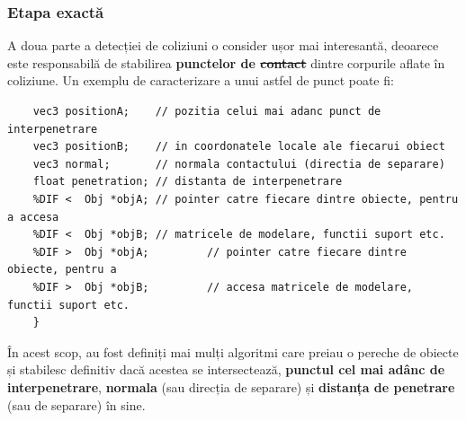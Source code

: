 \documentclass[12pt,a4paper]{report}
\providecommand{\DIFaddtex}[1]{{\protect\color{blue}\uwave{#1}}} %
\providecommand{\DIFdeltex}[1]{{\protect\color{red}\sout{#1}}}                      %
\providecommand{\DIFaddbegin}{} %
\providecommand{\DIFaddend}{} %
\providecommand{\DIFdelbegin}{} %
\providecommand{\DIFdelend}{} %
\providecommand{\DIFadd}[1]{\texorpdfstring{\DIFaddtex{#1}}{#1}} %
\providecommand{\DIFdel}[1]{\texorpdfstring{\DIFdeltex{#1}}{}} %
\newcommand{\DIFscaledelfig}{0.5}
\newlength{\DIFdelgraphicswidth} %
\newlength{\DIFdelgraphicsheight} %
\newcommand{\DIFaddincludegraphics}[2][]{{\color{blue}\fbox{\DIFOincludegraphics[#1]{#2}}}} %
\newcommand{\DIFdelincludegraphics}[2][]{%
	\sbox{\DIFdelgraphicsbox}{\DIFOincludegraphics[#1]{#2}}%
	\settoboxwidth{\DIFdelgraphicswidth}{\DIFdelgraphicsbox} %
	\settoboxtotalheight{\DIFdelgraphicsheight}{\DIFdelgraphicsbox} %
	\scalebox{\DIFscaledelfig}{%
		\parbox[b]{\DIFdelgraphicswidth}{\usebox{\DIFdelgraphicsbox}\\[-\baselineskip] \rule{\DIFdelgraphicswidth}{0em}}\llap{\resizebox{\DIFdelgraphicswidth}{\DIFdelgraphicsheight}{%
				\setlength{\unitlength}{\DIFdelgraphicswidth}%
				\begin{picture}(1,1)%
				\thicklines\linethickness{2pt} %
				{\color[rgb]{1,0,0}\put(0,0){\framebox(1,1){}}}%
				{\color[rgb]{1,0,0}\put(0,0){\line( 1,1){1}}}%
				{\color[rgb]{1,0,0}\put(0,1){\line(1,-1){1}}}%
				\end{picture}%
			}\hspace*{3pt}}} %
} %
\DeclareRobustCommand{\DIFaddbegin}{\DIFOaddbegin \let\includegraphics\DIFaddincludegraphics} %
\DeclareRobustCommand{\DIFaddend}{\DIFOaddend \let\includegraphics\DIFOincludegraphics} %
\DeclareRobustCommand{\DIFdelbegin}{\DIFOdelbegin \let\includegraphics\DIFdelincludegraphics} %
\DeclareRobustCommand{\DIFdelend}{\DIFOaddend \let\includegraphics\DIFOincludegraphics} %
\begin{document}
	\subsubsection{Etapa exactă}
	A doua parte a detecției de coliziuni o consider ușor mai interesantă, deoarece este responsabilă de stabilirea \textbf{punctelor de \DIFdelbegin \DIFdel{contact}\DIFdelend \DIFaddbegin \DIFadd{coliziune}\DIFaddend }\DIFaddbegin \label{punct_coliziune} \DIFaddend dintre corpurile aflate în coliziune. Un exemplu de caracterizare a unui astfel de punct poate fi:
	\DIFdelbegin %
	\DIFdelend \DIFaddbegin \begin{lstlisting}[style=myC++, label = {code:CollisionPointExample},alsolanguage=DIFcode]
	%DIF > struct CollisionPoint {
	vec3 positionA;    // pozitia celui mai adanc punct de interpenetrare
	vec3 positionB;    // in coordonatele locale ale fiecarui obiect
	vec3 normal;       // normala contactului (directia de separare)
	float penetration; // distanta de interpenetrare
	%DIF < 	Obj *objA; // pointer catre fiecare dintre obiecte, pentru a accesa
	%DIF < 	Obj *objB; // matricele de modelare, functii suport etc.
	%DIF > 	Obj *objA;         // pointer catre fiecare dintre obiecte, pentru a
	%DIF > 	Obj *objB;         // accesa matricele de modelare, functii suport etc.
	}
	\end{lstlisting}
	În acest scop, au fost definiți mai mulți algoritmi care preiau o pereche de obiecte și stabilesc definitiv dacă acestea se intersectează, \textbf{punctul cel mai adânc de interpenetrare}, \textbf{normala} (sau direcția de separare) și \textbf{distanța de penetrare} (sau de separare) în sine.
	
\end{document}
